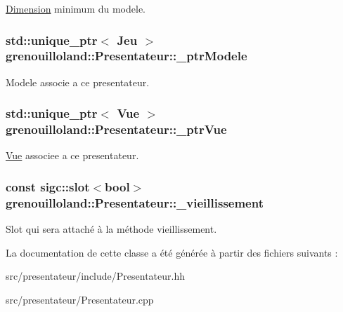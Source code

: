 \hyperlink{classgrenouilloland_1_1Dimension}{Dimension} minimum du modele. \hypertarget{classgrenouilloland_1_1Presentateur_a3418c1b3461d7e4a511ac71bf30d2a14}{
\subsubsection[{\-\_\-ptr\-Modele}]{\setlength{\rightskip}{0pt plus 5cm}std\-::unique\-\_\-ptr$<$ {\bf Jeu} $>$ grenouilloland\-::\-Presentateur\-::\-\_\-ptr\-Modele\hspace{0.3cm}{\ttfamily [protected]}}}\label{classgrenouilloland_1_1Presentateur_a3418c1b3461d7e4a511ac71bf30d2a14}
Modele associe a ce presentateur. \hypertarget{classgrenouilloland_1_1Presentateur_a806d2e46bff9428800f7b063015b792c}{
\subsubsection[{\-\_\-ptr\-Vue}]{\setlength{\rightskip}{0pt plus 5cm}std\-::unique\-\_\-ptr$<$ {\bf Vue} $>$ grenouilloland\-::\-Presentateur\-::\-\_\-ptr\-Vue\hspace{0.3cm}{\ttfamily [protected]}}}\label{classgrenouilloland_1_1Presentateur_a806d2e46bff9428800f7b063015b792c}
\hyperlink{classgrenouilloland_1_1Vue}{Vue} associee a ce presentateur. \hypertarget{classgrenouilloland_1_1Presentateur_ad51c240a49a31b60bf36578a14860ae8}{
\subsubsection[{\-\_\-vieillissement}]{\setlength{\rightskip}{0pt plus 5cm}const sigc\-::slot$<$bool$>$ grenouilloland\-::\-Presentateur\-::\-\_\-vieillissement\hspace{0.3cm}{\ttfamily [protected]}}}\label{classgrenouilloland_1_1Presentateur_ad51c240a49a31b60bf36578a14860ae8}
Slot qui sera attaché à la méthode vieillissement. 

La documentation de cette classe a été générée à partir des fichiers suivants \-:\begin{DoxyCompactItemize}
\item 
src/presentateur/include/Presentateur.\-hh\item 
src/presentateur/Presentateur.\-cpp\end{DoxyCompactItemize}
